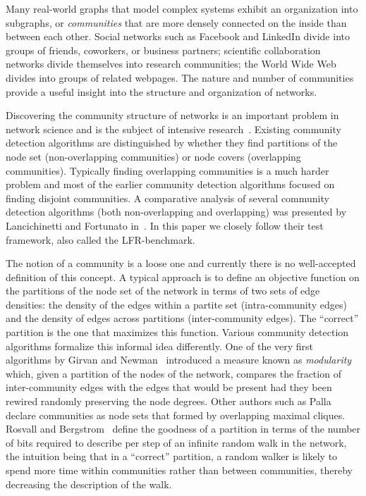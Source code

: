 Many real-world graphs that model complex systems exhibit an organization 
into subgraphs, or \textit{communities} that are more densely connected on the inside than between each other. 
Social networks such as Facebook and LinkedIn divide into groups of friends, 
coworkers, or business partners; scientific collaboration networks divide 
themselves into research communities; the World Wide Web divides into groups 
of related webpages. The nature and number of communities provide 
a useful insight into the structure and organization of networks. 

Discovering the community structure of networks is an 
important problem in network science and is the subject 
of intensive research~\cite{GN02,GN04,CNM04,RCC04,DM04,PDFV05,NL07,BGLL08,RB08,RN09}. 
Existing community detection algorithms are 
distinguished by whether they find partitions of the node set 
(non-overlapping communities) or node covers (overlapping communities). 
Typically finding overlapping communities is a much harder problem and most of the 
earlier community detection algorithms focused on finding disjoint 
communities. A comparative analysis of several community detection algorithms 
(both non-overlapping and overlapping) was presented by Lancichinetti and Fortunato 
in~\cite{LF09}. In this paper we closely follow their test framework, 
also called the LFR-benchmark.

The notion of a community is a loose one and currently there is no 
well-accepted definition of this concept. A typical approach is to define an 
objective function on the partitions of the node set of the network 
in terms of two sets of edge densities: the density of the 
edges within a partite set (intra-community edges) and the density of edges across partitions 
(inter-community edges). The ``correct'' partition is the one that maximizes this 
function. Various community detection algorithms formalize this
informal idea differently. One of the very first algorithms by
Girvan and Newman~\cite{GN02} introduced a measure known as \textit{modularity}
which, given a partition of the nodes of the network, compares the fraction of 
inter-community edges with the edges that would be present had they been 
rewired randomly preserving the node degrees. Other authors such as Palla 
\etal~\cite{PDFV05} declare communities as node sets that formed 
by overlapping maximal cliques. Rosvall and Bergstrom~\cite{RB08} 
define the goodness of a partition in terms of the number of bits required to 
describe per step of an infinite random walk in the network, the intuition being 
that in a ``correct'' partition, a random walker is likely to spend more time 
within communities rather than between communities, thereby decreasing the 
description of the walk.  

